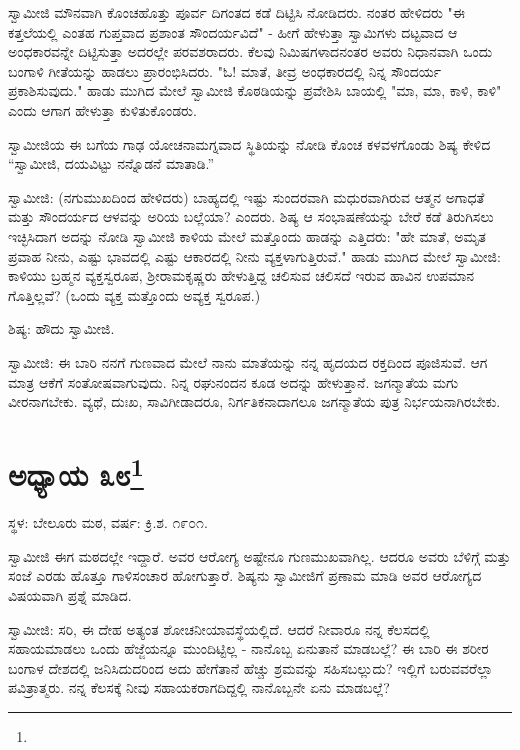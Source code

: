 ಸ್ವಾಮೀಜಿ ಮೌನವಾಗಿ ಕೊಂಚಹೊತ್ತು ಪೂರ್ವ ದಿಗಂತದ ಕಡೆ ದಿಟ್ಟಿಸಿ ನೋಡಿದರು. ನಂತರ ಹೇಳಿದರು "ಈ ಕತ್ತಲೆಯಲ್ಲಿ ಎಂತಹ ಗುಪ್ತವಾದ ಪ್ರಶಾಂತ ಸೌಂದರ್ಯವಿದೆ" - ಹೀಗೆ ಹೇಳುತ್ತಾ ಸ್ವಾಮಿಗಳು ದಟ್ಟವಾದ ಆ ಅಂಧಕಾರವನ್ನೇ ದಿಟ್ಟಿಸುತ್ತಾ ಅದರಲ್ಲೇ ಪರವಶರಾದರು. ಕೆಲವು ನಿಮಿಷಗಳಾದನಂತರ ಅವರು ನಿಧಾನವಾಗಿ ಒಂದು ಬಂಗಾಳಿ ಗೀತೆಯನ್ನು ಹಾಡಲು ಪ್ರಾರಂಭಿಸಿದರು. "ಓ! ಮಾತೆ, ತೀವ್ರ ಅಂಧಕಾರದಲ್ಲಿ ನಿನ್ನ ಸೌಂದರ್ಯ ಪ್ರಕಾಶಿಸುವುದು." ಹಾಡು ಮುಗಿದ ಮೇಲೆ ಸ್ವಾಮೀಜಿ ಕೊಠಡಿಯನ್ನು ಪ್ರವೇಶಿಸಿ ಬಾಯಲ್ಲಿ "ಮಾ, ಮಾ, ಕಾಳಿ, ಕಾಳಿ" ಎಂದು ಆಗಾಗ ಹೇಳುತ್ತಾ ಕುಳಿತುಕೊಂಡರು.

ಸ್ವಾಮೀಜಿಯ ಈ ಬಗೆಯ ಗಾಢ ಯೋಚನಾಮಗ್ನವಾದ ಸ್ಥಿತಿಯನ್ನು ನೋಡಿ ಕೊಂಚ ಕಳವಳಗೊಂಡು ಶಿಷ್ಯ ಕೇಳಿದ “ಸ್ವಾಮೀಜಿ, ದಯವಿಟ್ಟು ನನ್ನೊಡನೆ ಮಾತಾಡಿ.”

ಸ್ವಾಮೀಜಿ: (ನಗುಮುಖದಿಂದ ಹೇಳಿದರು) ಬಾಹ್ಯದಲ್ಲಿ ಇಷ್ಟು ಸುಂದರವಾಗಿ ಮಧುರವಾಗಿರುವ ಆತ್ಮನ ಅಗಾಧತೆ ಮತ್ತು ಸೌಂದರ್ಯದ ಆಳವನ್ನು ಅರಿಯ ಬಲ್ಲೆಯಾ? ಎಂದರು. ಶಿಷ್ಯ ಆ ಸಂಭಾಷಣೆಯನ್ನು ಬೇರೆ ಕಡೆ ತಿರುಗಿಸಲು ಇಚ್ಛಿಸಿದಾಗ ಅದನ್ನು ನೋಡಿ ಸ್ವಾಮೀಜಿ ಕಾಳಿಯ ಮೇಲೆ ಮತ್ತೊಂದು ಹಾಡನ್ನು ಎತ್ತಿದರು: "ಹೇ ಮಾತೆ, ಅಮೃತ ಪ್ರವಾಹ ನೀನು, ಎಷ್ಟು ಭಾವದಲ್ಲಿ ಎಷ್ಟು ಆಕಾರದಲ್ಲಿ ನೀನು ವ್ಯಕ್ತಳಾಗುತ್ತಿರುವೆ." ಹಾಡು ಮುಗಿದ ಮೇಲೆ ಸ್ವಾಮೀಜಿ: ಕಾಳಿಯು ಬ್ರಹ್ಮನ ವ್ಯಕ್ತಸ್ವರೂಪ, ಶ‍್ರೀರಾಮಕೃಷ್ಣರು ಹೇಳುತ್ತಿದ್ದ ಚಲಿಸುವ ಚಲಿಸದೆ ಇರುವ ಹಾವಿನ ಉಪಮಾನ ಗೊತ್ತಿಲ್ಲವೆ? (ಒಂದು ವ್ಯಕ್ತ ಮತ್ತೊಂದು ಅವ್ಯಕ್ತ ಸ್ವರೂಪ.)

ಶಿಷ್ಯ: ಹೌದು ಸ್ವಾಮೀಜಿ.

ಸ್ವಾಮೀಜಿ: ಈ ಬಾರಿ ನನಗೆ ಗುಣವಾದ ಮೇಲೆ ನಾನು ಮಾತೆಯನ್ನು ನನ್ನ ಹೃದಯದ ರಕ್ತದಿಂದ ಪೂಜಿಸುವೆ. ಆಗ ಮಾತ್ರ ಆಕೆಗೆ ಸಂತೋಷವಾಗುವುದು. ನಿನ್ನ ರಘುನಂದನ ಕೂಡ ಅದನ್ನು ಹೇಳುತ್ತಾನೆ. ಜಗನ್ಮಾತೆಯ ಮಗು ವೀರನಾಗಬೇಕು. ವ್ಯಥೆ, ದುಃಖ, ಸಾವಿಗೀಡಾದರೂ, ನಿರ್ಗತಿಕನಾದಾಗಲೂ ಜಗನ್ಮಾತೆಯ ಪುತ್ರ ನಿರ್ಭಯನಾಗಿರಬೇಕು.

\newpage

\chapter[ಅಧ್ಯಾಯ ೩೮]{ಅಧ್ಯಾಯ ೩೮\protect\footnote{}}

\begin{center}
ಸ್ಥಳ: ಬೇಲೂರು ಮಠ, ವರ್ಷ: ಕ್ರಿ.ಶ. ೧೯೦೧.
\end{center}

ಸ್ವಾಮೀಜಿ ಈಗ ಮಠದಲ್ಲೇ ಇದ್ದಾರೆ. ಅವರ ಆರೋಗ್ಯ ಅಷ್ಟೇನೂ ಗುಣಮುಖವಾಗಿಲ್ಲ. ಆದರೂ ಅವರು ಬೆಳಿಗ್ಗೆ ಮತ್ತು ಸಂಜೆ ಎರಡು ಹೊತ್ತೂ ಗಾಳಿಸಂಚಾರ ಹೋಗುತ್ತಾರೆ. ಶಿಷ್ಯನು ಸ್ವಾಮೀಜಿಗೆ ಪ್ರಣಾಮ ಮಾಡಿ ಅವರ ಆರೋಗ್ಯದ ವಿಷಯವಾಗಿ ಪ್ರಶ್ನೆ ಮಾಡಿದ.

ಸ್ವಾಮೀಜಿ: ಸರಿ, ಈ ದೇಹ ಅತ್ಯಂತ ಶೋಚನೀಯಾವಸ್ಥೆಯಲ್ಲಿದೆ. ಆದರೆ ನೀವಾರೂ ನನ್ನ ಕೆಲಸದಲ್ಲಿ ಸಹಾಯಮಾಡಲು ಒಂದು ಹೆಜ್ಜೆಯನ್ನೂ ಮುಂದಿಟ್ಟಿಲ್ಲ - ನಾನೊಬ್ಬ ಏನುತಾನೆ ಮಾಡಬಲ್ಲೆ? ಈ ಬಾರಿ ಈ ಶರೀರ ಬಂಗಾಳ ದೇಶದಲ್ಲಿ ಜನಿಸಿದುದರಿಂದ ಅದು ಹೇಗೆತಾನೆ ಹೆಚ್ಚು ಶ್ರಮವನ್ನು ಸಹಿಸಬಲ್ಲುದು? ಇಲ್ಲಿಗೆ ಬರುವವರೆಲ್ಲಾ ಪವಿತ್ರಾತ್ಮರು. ನನ್ನ ಕೆಲಸಕ್ಕೆ ನೀವು ಸಹಾಯಕರಾಗದಿದ್ದಲ್ಲಿ ನಾನೊಬ್ಬನೇ ಏನು ಮಾಡಬಲ್ಲೆ?

